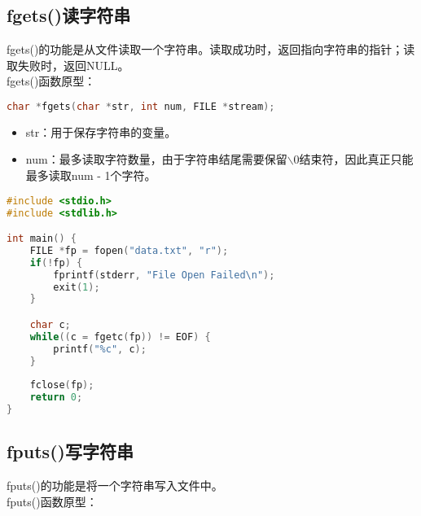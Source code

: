 \vspace{0.5cm}

\subsection{fgets()读字符串}

fgets()的功能是从文件读取一个字符串。读取成功时，返回指向字符串的指针；读取失败时，返回NULL。\\

fgets()函数原型：

\vspace{-0.5cm}

\begin{lstlisting}[language=C]
char *fgets(char *str, int num, FILE *stream);
\end{lstlisting}

\begin{itemize}
	\item str：用于保存字符串的变量。
	\item num：最多读取字符数量，由于字符串结尾需要保留$ \backslash $0结束符，因此真正只能最多读取num - 1个字符。
\end{itemize}

\vspace{0.5cm}


\begin{lstlisting}[language=C, title=fgets.c]
#include <stdio.h>
#include <stdlib.h>

int main() {
    FILE *fp = fopen("data.txt", "r");
    if(!fp) {
        fprintf(stderr, "File Open Failed\n");
        exit(1);
    }

    char c;
    while((c = fgetc(fp)) != EOF) {
        printf("%c", c);
    }
    
    fclose(fp);
    return 0;
}
\end{lstlisting}

\vspace{0.5cm}

\subsection{fputs()写字符串}

fputs()的功能是将一个字符串写入文件中。\\

fputs()函数原型：

\vspace{-0.5cm}

